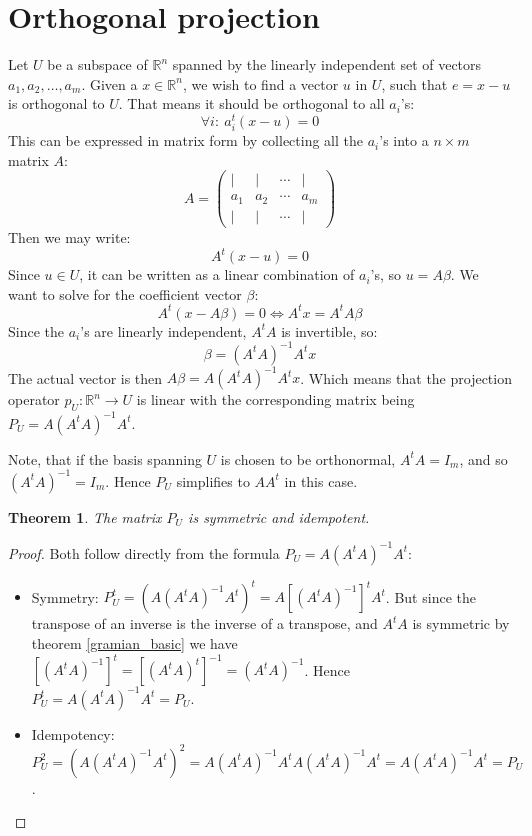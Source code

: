 \documentclass[12pt, a4paper]{article}
\newtheorem{theorem}{Theorem}[section]
\numberwithin{equation}{section}
\begin{document}
\section{Orthogonal projection}
Let $U$ be a subspace of $\mathbb{R}^n$ spanned by the linearly independent set of vectors $a_1, a_2,\ldots, a_m$. Given a $x\in\mathbb{R}^n$, we wish to find a vector $u$ in $U$, such that $e=x-u$ is orthogonal to $U$. That means it should be orthogonal to all $a_i$'s:
\begin{equation}
\forall i:\ a_i^t(x-u)=0
\end{equation}
This can be expressed in matrix form by collecting all the $a_i$'s into a $n\times m$ matrix $A$:
\begin{equation}
A=
\begin{pmatrix}
|	&	|	&	\cdots	&	|\\
a_1	&	a_2	&	\cdots	&	a_m\\
|	&	|	&	\cdots	&	|
\end{pmatrix}
\end{equation}
Then we may write:
\begin{equation}
A^t(x-u)=0
\end{equation}
Since $u\in U$, it can be written as a linear combination of $a_i$'s, so $u=A\beta$. We want to solve for the coefficient vector $\beta$:
\begin{equation}
A^t(x-A\beta)=0\Leftrightarrow A^t x=A^t A\beta
\end{equation}
Since the $a_i$'s are linearly independent, $A^t A$ is invertible, so: 
\begin{equation}
\beta=(A^t A)^{-1}A^t x
\end{equation}
The actual vector is then $A\beta=A(A^t A)^{-1}A^t x$. Which means that the projection operator $p_U:\mathbb{R}^n\rightarrow U$ is linear with the corresponding matrix being $P_U=A(A^t A)^{-1}A^t$.

Note, that if the basis spanning $U$ is chosen to be orthonormal, $A^t A=I_m$, and so $(A^t A)^{-1}=I_m$. Hence $P_U$ simplifies to $AA^t$ in this case.

\begin{theorem}
\label{projection_characterization}
The matrix $P_U$ is symmetric and idempotent.
\end{theorem}
\begin{proof}
Both follow directly from the formula $P_U=A(A^t A)^{-1}A^t$:
\begin{itemize}
\item Symmetry: $P_U^t=\left(A(A^t A)^{-1}A^t\right)^t=A\left[(A^t A)^{-1}\right]^t A^t$. But since the transpose of an inverse is the inverse of a transpose, and $A^t A$ is symmetric by theorem \ref{gramian_basic} we have $\left[(A^t A)^{-1}\right]^t=\left[(A^t A)^t\right]^{-1}=(A^t A)^{-1}$. Hence $P_U^t=A(A^t A)^{-1}A^t=P_U$.
\item Idempotency: $P_U^2=\left(A(A^t A)^{-1}A^t\right)^2=A(A^t A)^{-1}A^t A(A^t A)^{-1}A^t=A(A^t A)^{-1}A^t=P_U$.
\end{itemize}
\end{proof}
\end{document}
